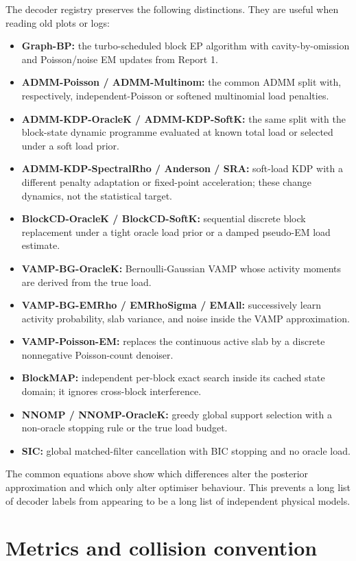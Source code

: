 \documentclass[11pt]{article}
\begin{document}
The decoder registry preserves the following distinctions. They are useful when reading old plots or logs:
\begin{itemize}
 \item \textbf{Graph-BP:} the turbo-scheduled block EP algorithm with cavity-by-omission and Poisson/noise EM updates from
 Report 1.
 \item \textbf{ADMM-Poisson / ADMM-Multinom:} the common ADMM split with, respectively, independent-Poisson or softened
 multinomial load penalties.
 \item \textbf{ADMM-KDP-OracleK / ADMM-KDP-SoftK:} the same split with the block-state dynamic programme evaluated at known
 total load or selected under a soft load prior.
 \item \textbf{ADMM-KDP-SpectralRho / Anderson / SRA:} soft-load KDP with a different penalty adaptation or fixed-point
 acceleration; these change dynamics, not the statistical target.
 \item \textbf{BlockCD-OracleK / BlockCD-SoftK:} sequential discrete block replacement under a tight oracle load prior or a
 damped pseudo-EM load estimate.
 \item \textbf{VAMP-BG-OracleK:} Bernoulli-Gaussian VAMP whose activity moments are derived from the true load.
 \item \textbf{VAMP-BG-EMRho / EMRhoSigma / EMAll:} successively learn activity probability, slab variance, and noise inside
 the VAMP approximation.
 \item \textbf{VAMP-Poisson-EM:} replaces the continuous active slab by a discrete nonnegative Poisson-count denoiser.
 \item \textbf{BlockMAP:} independent per-block exact search inside its cached state domain; it ignores cross-block interference.
 \item \textbf{NNOMP / NNOMP-OracleK:} greedy global support selection with a non-oracle stopping rule or the true load budget.
 \item \textbf{SIC:} global matched-filter cancellation with BIC stopping and no oracle load.
\end{itemize}

The common equations above show which differences alter the posterior approximation and which only alter optimiser
behaviour. This prevents a long list of decoder labels from appearing to be a long list of independent physical models.

\section{Metrics and collision convention}
\end{document}
